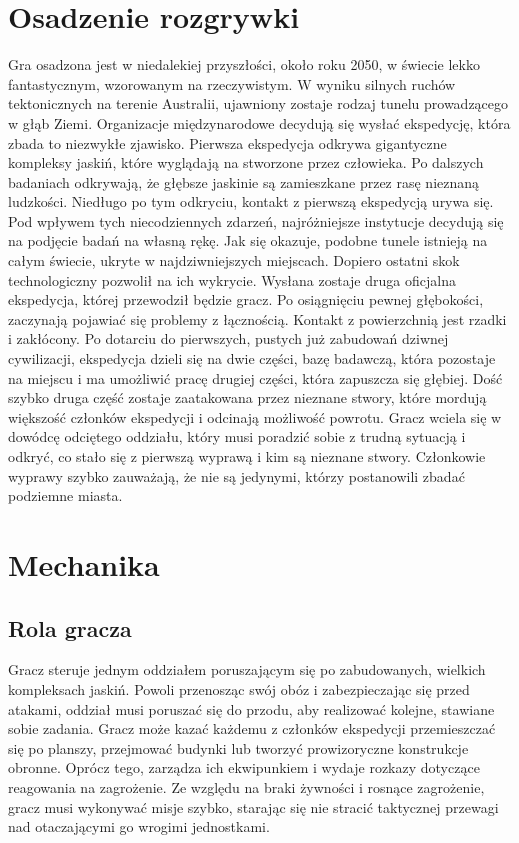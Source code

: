 \documentclass[licencjacka]{pracamgr}
\begin{document}
  \section{Osadzenie rozgrywki}
  Gra osadzona jest w niedalekiej przyszłości, około roku 2050, w świecie lekko fantastycznym, wzorowanym na
  rzeczywistym. W wyniku silnych ruchów tektonicznych na terenie Australii, ujawniony zostaje rodzaj tunelu
  prowadzącego w głąb Ziemi. Organizacje międzynarodowe decydują się wysłać ekspedycję, która zbada to niezwykłe
  zjawisko. Pierwsza ekspedycja odkrywa gigantyczne kompleksy jaskiń, które wyglądają na stworzone przez człowieka.
  Po dalszych badaniach odkrywają, że głębsze jaskinie są zamieszkane przez rasę nieznaną ludzkości. Niedługo
  po tym odkryciu, kontakt z pierwszą ekspedycją urywa się. Pod wpływem tych niecodziennych zdarzeń, najróżniejsze
  instytucje decydują się na podjęcie badań na własną rękę. Jak się okazuje, podobne tunele istnieją na całym świecie,
  ukryte w najdziwniejszych miejscach. Dopiero ostatni skok technologiczny pozwolił na ich wykrycie. Wysłana zostaje
  druga oficjalna ekspedycja, której przewodził będzie gracz. Po osiągnięciu pewnej głębokości, zaczynają pojawiać się
  problemy z łącznością. Kontakt z powierzchnią jest rzadki i zakłócony. Po dotarciu do pierwszych, pustych już zabudowań
  dziwnej cywilizacji, ekspedycja dzieli się na dwie części, bazę badawczą, która pozostaje na miejscu i ma umożliwić
  pracę drugiej części, która zapuszcza się głębiej. Dość szybko druga część zostaje zaatakowana przez nieznane stwory,
  które mordują większość członków ekspedycji i odcinają możliwość powrotu. Gracz wciela się w dowódcę odciętego
  oddziału, który musi poradzić sobie z trudną sytuacją i odkryć, co stało się z pierwszą wyprawą i kim są nieznane
  stwory. Członkowie wyprawy szybko zauważają, że nie są jedynymi, którzy postanowili zbadać podziemne miasta.
  
  \section{Mechanika}
    \subsection{Rola gracza}
    Gracz steruje jednym oddziałem poruszającym się po zabudowanych, wielkich kompleksach jaskiń. Powoli przenosząc
    swój obóz i zabezpieczając się przed atakami, oddział musi poruszać się do przodu, aby realizować kolejne, stawiane
    sobie zadania. Gracz może kazać każdemu z członków ekspedycji przemieszczać się po planszy, przejmować budynki lub
    tworzyć prowizoryczne konstrukcje obronne. Oprócz tego, zarządza ich ekwipunkiem i wydaje rozkazy dotyczące reagowania
    na zagrożenie. Ze względu na braki żywności i rosnące zagrożenie, gracz musi wykonywać misje szybko, starając się
    nie stracić taktycznej przewagi nad otaczającymi go wrogimi jednostkami.
    
\end{document}
